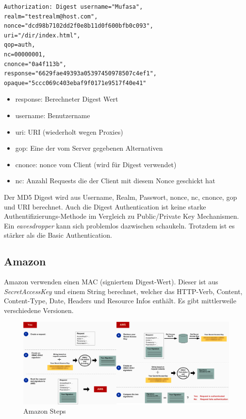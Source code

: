 \begin{lstlisting}[caption=HTTP Request Header]
Authorization: Digest username="Mufasa",
realm="testrealm@host.com",
nonce="dcd98b7102dd2f0e8b11d0f600bfb0c093",
uri="/dir/index.html",
qop=auth,
nc=00000001,
cnonce="0a4f113b",
response="6629fae49393a05397450978507c4ef1",
opaque="5ccc069c403ebaf9f0171e9517f40e41"
\end{lstlisting}

\begin{itemize}
	\item response: Berechneter Digest Wert
	\item username: Benutzername
	\item uri: URI (wiederholt wegen Proxies)
	\item gop: Eine der vom Server gegebenen Alternativen
	\item cnonce: nonce vom Client (wird für Digest verwendet)
	\item nc: Anzahl Requests die der Client mit diesem Nonce
	geschickt hat
\end{itemize}

Der MD5 Digest wird aus Username, Realm, Passwort, nonce, nc, cnonce, gop und URI berechnet. Auch die Digest Authentication ist keine starke Authentifizierungs-Methode im Vergleich zu Public/Private Key Mechanismen. Ein \textit{eavesdropper} kann sich problemlos dazwischen schaukeln. Trotzdem ist es stärker als die Basic Authentication. 

\newpage

\subsection{Amazon}

Amazon verwenden einen MAC (signiertem Digest-Wert). Dieser ist aus \textit{SecretAccessKey} und einem String berechnet, welcher das HTTP-Verb, Content, Content-Type, Date, Headers und Resource Infos enthält. Es gibt mittlerweile verschiedene Versionen.

\begin{figure}[h!]
\centering
\includegraphics[width=\linewidth]{fig/amazon-steps}
\caption{Amazon Steps}
\label{fig:amazon-steps}
\end{figure}

